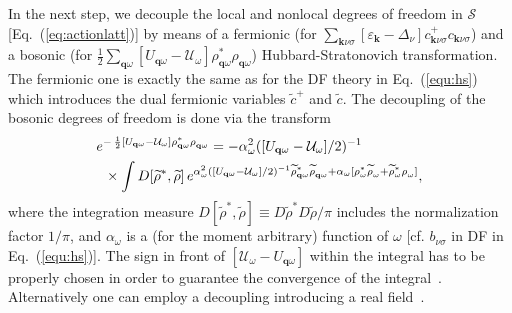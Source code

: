 \documentclass[rmp,aps,reprint,amsmath,amssymb,superscriptaddress,showpacs,nofootinbib]{revtex4-1}
\begin{document}
In the next step, we decouple the local and nonlocal degrees of freedom in $\mathcal{S}$ [Eq.~(\ref{eq:actionlatt})] by means of a  fermionic (for $\sum_{\mathbf{k}\nu\sigma}[\varepsilon_{\mathbf{k}}-\Delta_\nu]c^+_{\mathbf{k}\nu\sigma}c_{\mathbf{k}\nu\sigma}$) and a bosonic (for $\frac{1}{2}\sum_{\mathbf{q}\omega}[U_{\mathbf{q}\omega}-\mathcal{U}_\omega]\rho^*_{\mathbf{q}\omega}\rho_{\mathbf{q}\omega}$) Hubbard-Stratonovich transformation. The fermionic one is exactly the same as for the DF theory in Eq.~(\ref{equ:hs}) which introduces the dual fermionic variables $\widetilde{c}^+$ and $\widetilde{c}$. The decoupling of the bosonic degrees of freedom is done via the transform
\begin{align}
\label{equ:bhs}
  &e^{-\,\frac12 [U_{\mathbf{q}\omega}-\mathcal{U}_\omega]\rho^{*}_{{\bf q}\omega}\rho^{\phantom{*}}_{{\bf q}\omega}} =-\alpha_\omega^2 ([U_{\mathbf{q}\omega}-\mathcal{U}_\omega]/2)^{-1}\\ &\;\;\times\int D[ \widetilde{\rho}^*,\widetilde{\rho}]\,e^{\alpha_\omega^2([U_{\mathbf{q}\omega}-\mathcal{U}_\omega]/2)^{-1}\widetilde{\rho}^{*}_{{\bf q}\omega} \widetilde{\rho}^{\phantom{*}}_{{\bf q}\omega} + \alpha_\omega[\rho^{*}_{\omega}\widetilde{\rho}^{\phantom{*}}_{\omega} + \widetilde{\rho}^{*}_{\omega}\rho^{\phantom{*}}_{\omega}]},\notag
\end{align}
where the integration measure $D[ \widetilde{\rho}^*,\widetilde{\rho}]\equiv D\widetilde{\rho}^*D\widetilde{\rho}/\pi$ includes the normalization factor $1/\pi$, and $\alpha_\omega$ is a (for the moment arbitrary) function of $\omega$ [cf. $b_{\nu\sigma}$ in DF in Eq.~(\ref{equ:hs})]. The sign in front of $[\mathcal{U}_\omega-U_{\mathbf{q}\omega}]$ within the integral has to be properly chosen in order to guarantee the convergence of the integral~\cite{Rubtsov12}. Alternatively one can employ a decoupling introducing a real field~\cite{vanLoon2014a}.
\end{document}

